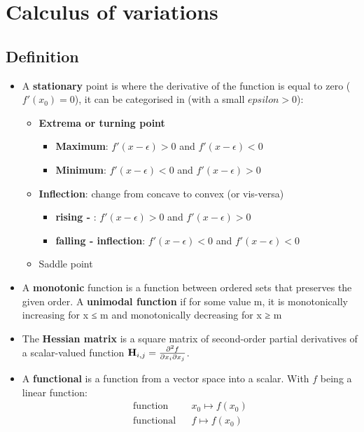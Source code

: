 \documentclass[twocolumn]{article}
\numberwithin{equation}{section}
\begin{document}
\newpage
\section{Calculus of variations}
	\subsection{Definition}
\begin{itemize}
	\item A \textbf{stationary} point is where the derivative of the function is equal to zero ($f'(x_0)=0$), it can be categorised in (with a small $epsilon>0$):
	\begin{itemize}
		\item \textbf{Extrema or turning point}
		\begin{itemize}
			\item \textbf{Maximum}: $f'(x-\epsilon)>0$ and $f'(x-\epsilon)<0$
			\item \textbf{Minimum}: $f'(x-\epsilon)<0$ and $f'(x-\epsilon)>0$
		\end{itemize}
		\item \textbf{Inflection}:  change from concave to convex (or vis-versa)
		\begin{itemize}
			\item \textbf{rising - }: $f'(x-\epsilon)>0$ and $f'(x-\epsilon)>0$
			\item \textbf{falling - inflection}: $f'(x-\epsilon)<0$ and $f'(x-\epsilon)<0$
		\end{itemize}
		\item Saddle point
	\end{itemize}
	
	\item A \textbf{monotonic} function is a function between ordered sets that preserves the given order. A \textbf{unimodal function} if for some value m, it is monotonically increasing for x ≤ m and monotonically decreasing for x ≥ m
	
	\item The \textbf{Hessian matrix} is a square matrix of second-order partial derivatives of a scalar-valued function $\bold H_{i,j} = \frac{\partial^2 f}{\partial x_i \partial x_j}$.
	
	\item A \textbf{functional} is a function from a vector space into a scalar. With $f$ being a linear function: 
	 \begin{align*}
		\text{function}   && x_0\mapsto f(x_0)\\
		\text{functional} && f\mapsto f(x_0)
	\end{align*} 
	

\end{itemize}
\end{document}
